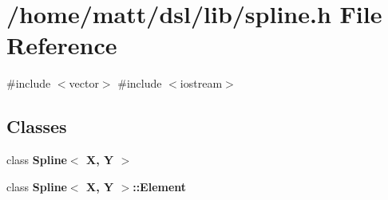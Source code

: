 \section{/home/matt/dsl/lib/spline.h \-File \-Reference}
\label{spline_8h}
{\ttfamily \#include $<$vector$>$}\*
{\ttfamily \#include $<$iostream$>$}\*
\subsection*{\-Classes}
\begin{DoxyCompactItemize}
\item 
class {\bf \-Spline$<$ X, Y $>$}
\item 
class {\bf \-Spline$<$ X, Y $>$\-::\-Element}
\end{DoxyCompactItemize}
